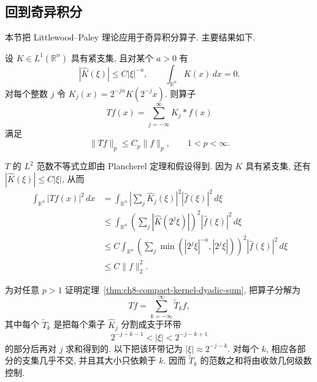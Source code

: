 \subsection{回到奇异积分}
\label{sec:ch8-return-singular-integrals}

本节把 Littlewood--Paley 理论应用于奇异积分算子. 主要结果如下.

\begin{Theorem}
\label{thm:ch8-compact-kernel-dyadic-sum}
设 $K\in L^1(\mathbb R^n)$ 具有紧支集, 且对某个 $a>0$ 有
\[
 |\widehat K(\xi)|\le C|\xi|^{-a},
 \qquad
 \int_{\mathbb R^n}K(x)\,dx=0.
\]
对每个整数 $j$ 令 $K_j(x)=2^{-jn}K(2^{-j}x)$. 则算子
\[
 Tf(x)=\sum_{j=-\infty}^{\infty}K_j*f(x)
\]
满足
\[
 \|Tf\|_p\le C_p\|f\|_p,
 \qquad 1<p<\infty.
\]
\end{Theorem}

\hypertarget{chapter-08-page-185}{}
$T$ 的 $L^2$ 范数不等式立即由 Plancherel 定理和假设得到. 因为 $K$ 具有紧支集, 还有 $|\widehat K(\xi)|\le C|\xi|$, 从而
\[
 \begin{aligned}
 \int_{\mathbb R^n}|Tf(x)|^2\,dx
 &=\int_{\mathbb R^n}\left|\sum_j\widehat K_j(\xi)\right|^2|\widehat f(\xi)|^2\,d\xi\\
 &\le\int_{\mathbb R^n}\left(\sum_j|\widehat K(2^j\xi)|\right)^2|\widehat f(\xi)|^2\,d\xi\\
 &\le C\int_{\mathbb R^n}\left(\sum_j\min(|2^j\xi|^{-a},|2^j\xi|)\right)^2|\widehat f(\xi)|^2\,d\xi\\
 &\le C\|f\|_2^2.
 \end{aligned}
\]

为对任意 $p>1$ 证明定理~\ref{thm:ch8-compact-kernel-dyadic-sum}, 把算子分解为
\[
 Tf=\sum_{k=-\infty}^{\infty}\widetilde T_kf,
\]
其中每个 $\widetilde T_k$ 是把每个乘子 $\widehat K_j$ 分割成支于环带
\[
 2^{-j-k-1}<|\xi|<2^{-j-k+1}
\]
的部分后再对 $j$ 求和得到的. 以下把该环带记为 $|\xi|\approx2^{-j-k}$. 对每个 $k$, 相应各部分的支集几乎不交, 并且其大小只依赖于 $k$. 因而 $\widetilde T_k$ 的范数之和将由收敛几何级数控制.

